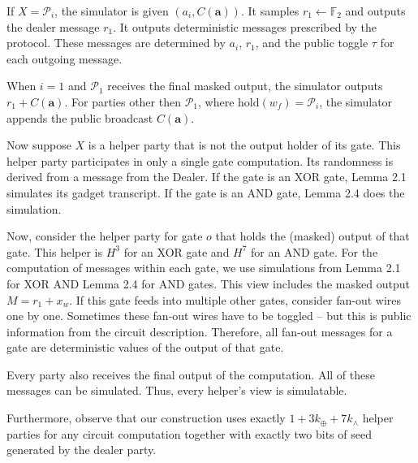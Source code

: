\documentclass[10pt,a4paper]{article}
\begin{document}
If $X=\mathcal{P}_{i}$, the simulator is given $(a_{i},C(\mathbf{a}))$. It samples $r_{1}\leftarrow\mathbb{F}_{2}$ and outputs the dealer message $r_{1}$. It outputs deterministic messages prescribed by the protocol.
These messages are determined by $a_{i}$, $r_{1}$, and the public toggle $\tau$ for each outgoing message.\par




When $i=1$ and $\mathcal{P}_{1}$ receives the final masked output, the simulator outputs $r_{1}+C(\mathbf{a})$. For parties other then $\mathcal{P}_{1}$, where $\mathrm{hold}(w_{f})=\mathcal{P}_{i}$, the simulator appends the public broadcast $C(\mathbf{a})$.\par




Now suppose $X$ is a helper party that is not the output holder of its gate. This helper party participates in only a single gate computation. Its randomness is derived from a message from the Dealer. If the gate is an XOR gate, Lemma 2.1 simulates its gadget transcript. If the gate is an AND gate, Lemma 2.4 does the simulation.\par




Now, consider the helper party for gate $o$ that holds the (masked) output of that gate. This helper is $H^{3}$ for an XOR gate and $H^{7}$ for an AND gate. For the computation of messages within each gate, we use simulations from Lemma 2.1 for XOR AND Lemma 2.4 for AND gates. This view includes the masked output $M=r_{1}+x_{w}$. If this gate feeds into multiple other gates, consider fan-out wires one by one. Sometimes these fan-out wires have to be toggled – but this is public information from the circuit description.
Therefore, all fan-out messages for a gate are deterministic values of the output of that gate.\par




Every party also receives the final output of the computation. All of these messages can be simulated. Thus, every helper’s view is simulatable.\par




Furthermore, observe that our construction uses exactly $1+3k_{\oplus}+7k_{\wedge}$ helper parties for any circuit computation together with exactly two bits of seed generated by the dealer party.\par
\end{document}
